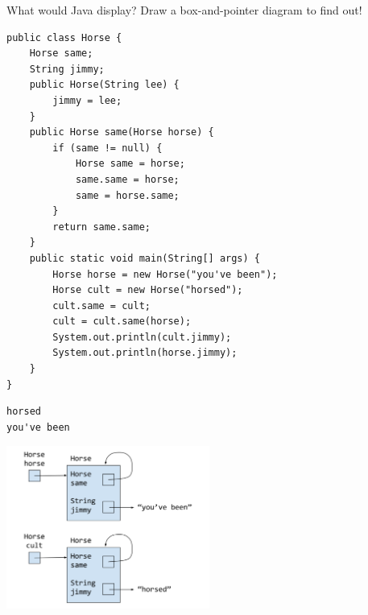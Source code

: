 \question What would Java display? Draw a box-and-pointer diagram to find out!
\begin{lstlisting}
public class Horse {
    Horse same;
    String jimmy;
    public Horse(String lee) {
        jimmy = lee;
    }
    public Horse same(Horse horse) {
        if (same != null) {
            Horse same = horse;
            same.same = horse;
            same = horse.same;
        }
        return same.same;
    }
    public static void main(String[] args) {
        Horse horse = new Horse("you've been");
        Horse cult = new Horse("horsed");
        cult.same = cult;
        cult = cult.same(horse);
        System.out.println(cult.jimmy);
        System.out.println(horse.jimmy);
    }
}
\end{lstlisting}

\begin{solution}[1.5in]
\begin{verbatim}
horsed
you've been
\end{verbatim}

\includegraphics[width=0.5\textwidth]{samehorse}
\end{solution}
